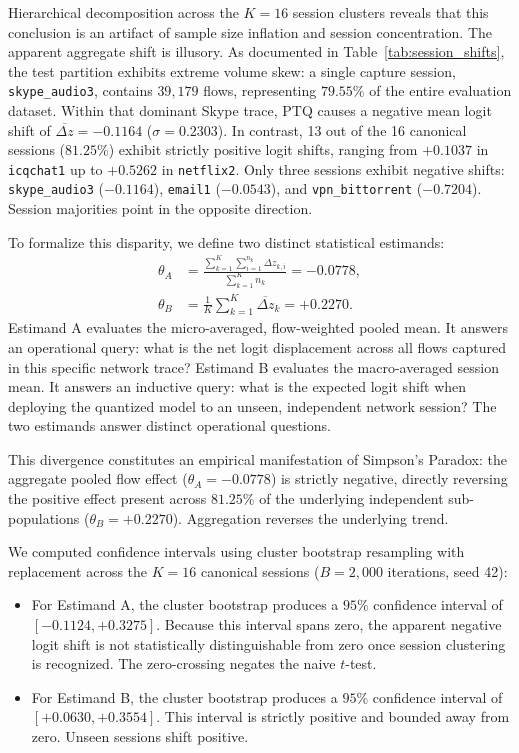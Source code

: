 \documentclass[conference]{IEEEtran}
\begin{document}
Hierarchical decomposition across the $K = 16$ session clusters reveals that this conclusion is an artifact of sample size inflation and session concentration. The apparent aggregate shift is illusory. As documented in Table~\ref{tab:session_shifts}, the test partition exhibits extreme volume skew: a single capture session, \texttt{skype\_audio3}, contains $39,179$ flows, representing $79.55\%$ of the entire evaluation dataset. Within that dominant Skype trace, PTQ causes a negative mean logit shift of $\overline{\Delta z} = -0.1164$ ($\sigma = 0.2303$). In contrast, 13 out of the 16 canonical sessions ($81.25\%$) exhibit strictly positive logit shifts, ranging from $+0.1037$ in \texttt{icqchat1} up to $+0.5262$ in \texttt{netflix2}. Only three sessions exhibit negative shifts: \texttt{skype\_audio3} ($-0.1164$), \texttt{email1} ($-0.0543$), and \texttt{vpn\_bittorrent} ($-0.7204$). Session majorities point in the opposite direction.

To formalize this disparity, we define two distinct statistical estimands:
\begin{align}
\theta_A &= \frac{\sum_{k=1}^K \sum_{i=1}^{n_k} \Delta z_{k,i}}{\sum_{k=1}^K n_k} = -0.0778, \label{eq:estimand_a_eval} \\
\theta_B &= \frac{1}{K} \sum_{k=1}^K \overline{\Delta z}_k = +0.2270. \label{eq:estimand_b_eval}
\end{align}
Estimand A evaluates the micro-averaged, flow-weighted pooled mean. It answers an operational query: what is the net logit displacement across all flows captured in this specific network trace? Estimand B evaluates the macro-averaged session mean. It answers an inductive query: what is the expected logit shift when deploying the quantized model to an unseen, independent network session? The two estimands answer distinct operational questions.

This divergence constitutes an empirical manifestation of Simpson's Paradox: the aggregate pooled flow effect ($\theta_A = -0.0778$) is strictly negative, directly reversing the positive effect present across $81.25\%$ of the underlying independent sub-populations ($\theta_B = +0.2270$). Aggregation reverses the underlying trend.

We computed confidence intervals using cluster bootstrap resampling with replacement across the $K = 16$ canonical sessions ($B = 2,000$ iterations, seed 42):
\begin{itemize}
    \item For Estimand A, the cluster bootstrap produces a $95\%$ confidence interval of $[-0.1124, +0.3275]$. Because this interval spans zero, the apparent negative logit shift is not statistically distinguishable from zero once session clustering is recognized. The zero-crossing negates the naive $t$-test.
    \item For Estimand B, the cluster bootstrap produces a $95\%$ confidence interval of $[+0.0630, +0.3554]$. This interval is strictly positive and bounded away from zero. Unseen sessions shift positive.
\end{itemize}
\end{document}
